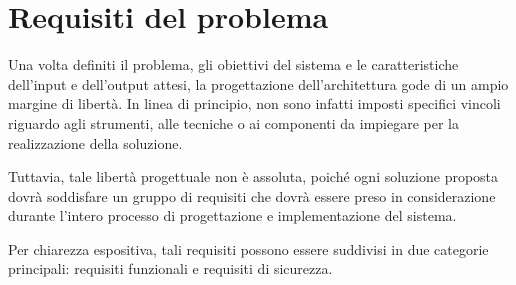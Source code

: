 \section{Requisiti del problema} %

Una volta definiti il problema, gli obiettivi del sistema e le caratteristiche dell'input e dell'output attesi, la progettazione dell'architettura gode di un ampio margine di libertà. In linea di principio, non sono infatti imposti specifici vincoli riguardo agli strumenti, alle tecniche o ai componenti da impiegare per la realizzazione della soluzione.

Tuttavia, tale libertà progettuale non è assoluta, poiché ogni soluzione proposta dovrà soddisfare un gruppo di requisiti che dovrà essere preso in considerazione durante l'intero processo di progettazione e implementazione del sistema.

Per chiarezza espositiva, tali requisiti possono essere suddivisi in due categorie principali: requisiti funzionali e requisiti di sicurezza.

